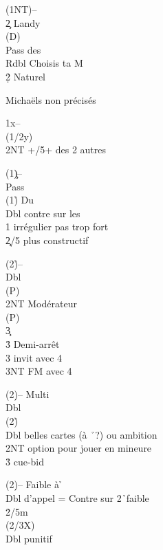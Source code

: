 \documentclass[a4paper]{article}
\begin{document}
\begin{bidtable}
(1NT)--\\
2\c \> Landy\+\\
(D)\+\\
Pass \> des \c \\
Rdbl \> Choisis ta M\\
2\d\h\s \> Naturel\-\-
\end{bidtable}

Michaëls non précisés

\begin{bidtable}
1x--\+\\
(1/2y)\+\\
2NT +/5+ des 2 autres\-\-
\end{bidtable}

\begin{bidtable}
(1\c)--\+\\
Pass\+\\
(1\h) \> Du \s \+\\
Dbl \> contre sur les \s \\
1\s \> irrégulier pas trop fort\\
2\c {}/5 plus constructif\-\-\-
\end{bidtable}

\begin{bidtable}
(2\h)--\+\\
Dbl\+\\
(P)\+\\
2NT \> Modérateur\\
\>(P)\+\\
3\c\+\\
3\h \> Demi-arrêt\\
3\s \> invit avec 4\s \\
3NT \> FM avec 4\s \-\-\-\-\-
\end{bidtable}

\begin{bidtable}
(2\d)-- \> Multi\+\\
Dbl\+\\
(2\h)\+\\
Dbl  belles cartes (à \h\ ?) ou ambition\\
2NT \> option pour jouer en mineure\\
3\h \> cue-bid\-\-\-
\end{bidtable}

\begin{bidtable}
(2\d)-- \> Faible à \h \+\\
Dbl \> d'appel = Contre sur 2\h\ faible\\
2\h {}\s /5m\+\\
(2/3X)\+\\
Dbl \> punitif\-\-\-
\end{bidtable}
\end{document}
